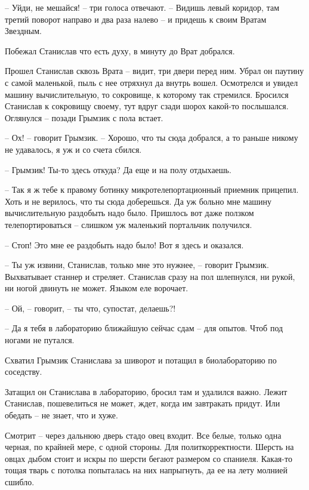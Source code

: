 \documentclass[ebook,oneside,final,openright]{memoir}
\begin{document}
– Уйди, не мешайся! – три голоса отвечают. – Видишь левый коридор, там третий поворот направо и два раза налево – и придешь к своим Вратам Звездным.\par
\par
Побежал Станислав что есть духу, в минуту до Врат добрался.\par
\par
Прошел Станислав сквозь Врата – видит, три двери перед ним. Убрал он паутину с самой маленькой, пыль с нее отряхнул да внутрь вошел. Осмотрелся и увидел машину вычислительную, то сокровище, к которому так стремился. Бросился Станислав к сокровищу своему, тут вдруг сзади шорох какой-то послышался. Оглянулся – позади Грымзик с пола встает.\par
– Ох! – говорит Грымзик. – Хорошо, что ты сюда добрался, а то раньше никому не удавалось, я уж и со счета сбился.\par
– Грымзик! Ты-то здесь откуда? Да еще и на полу отдыхаешь.\par
– Так я ж тебе к правому ботинку микротелепортационный приемник прицепил. Хоть и не верилось, что ты сюда доберешься. Да уж больно мне машину вычислительную раздобыть надо было. Пришлось вот даже ползком телепортироваться – слишком уж маленький портальчик получился.\par
– Стоп! Это мне ее раздобыть надо было! Вот я здесь и оказался.\par
– Ты уж извини, Станислав, только мне это нужнее, – говорит Грымзик. Выхватывает станнер и стреляет. Станислав сразу на пол шлепнулся, ни рукой, ни ногой двинуть не может. Языком еле ворочает.\par
– Ой, – говорит, – ты что, супостат, делаешь?!\par
– Да я тебя в лабораторию ближайшую сейчас сдам – для опытов. Чтоб под ногами не путался.\par
Схватил Грымзик Станислава за шиворот и потащил в биолабораторию по соседству.\par
\par
Затащил он Станислава в лабораторию, бросил там и удалился важно. Лежит Станислав, пошевелиться не может, ждет, когда им завтракать придут. Или обедать – не знает, что и хуже. \par
Смотрит – через дальнюю дверь стадо овец входит. Все белые, только одна черная, по крайней мере, с одной стороны. Для политкорректности. Шерсть на овцах дыбом стоит и искры по шерсти бегают размером со спаниеля. Какая-то тощая тварь с потолка попыталась на них напрыгнуть, да ее на лету молнией сшибло.\par
\end{document}
